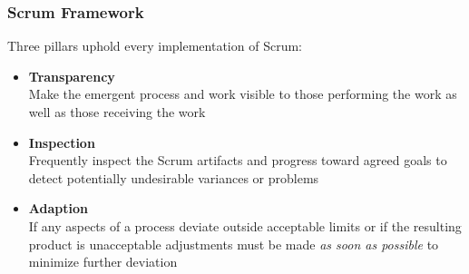 \begin{frame}
	\frametitle{Scrum Framework}
	Three pillars uphold every implementation of Scrum:
	\vspace{1em}
	\begin{itemize}
		\setlength\itemsep{0.7em}
		\item<1-> \textbf{Transparency}\\
		Make the emergent process and work visible to those performing the work as well as those receiving the work
		\item<2-> \textbf{Inspection}\\
		Frequently inspect the Scrum artifacts and progress toward agreed goals to detect potentially undesirable variances or problems
		\item<3-> \textbf{Adaption}\\
		If any aspects of a process deviate outside acceptable limits or if the resulting product is unacceptable adjustments must be made \textit{as soon as possible} to minimize further deviation
	\end{itemize}
\end{frame}